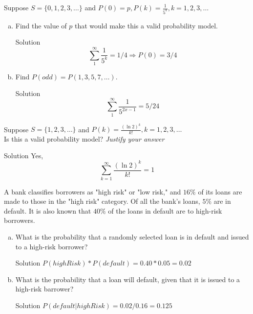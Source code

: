 \documentclass{article}
\begin{document}
\begin{spacing}{1.1}
\begin{homeworkProblem}
	Suppose $S = \{ 0,1,2,3, \dots \}$ and $P( 0) = p, P( k) = \frac{1}{{{5^k}}},k = 1,2,3, \ldots $
	\begin{enumerate}[(a)]
		\item Find the value of $p$ that would make this a valid probability model.
			\begin{homeworkSection}{Solution}
				\[\sum\limits_1^\infty  {\frac{1}{{{5^k}}}}  = 1/4 \Rightarrow P(0) = 3/4\]
			\end{homeworkSection}	
		\item Find $P( odd) = P( 1,3,5,7, \dots)$.
			\begin{homeworkSection}{Solution}
				\[\sum\limits_1^\infty  {\frac{1}{{{5^{2x - 1}}}}}  = 5/24\]
			\end{homeworkSection}	
	\end{enumerate}			
\end{homeworkProblem}
\begin{homeworkProblem}
	Suppose $S = \{ 1,2,3,\dots \}$ and $P( k) = \frac{ (\ln 2)^k}{k!}, k = 1,2,3,\dots$\\
	Is this a valid probability model? \emph{ Justify your answer}
		\begin{homeworkSection}{Solution}
			Yes, \[\sum\limits_{k = 1}^\infty  {\frac{{{{\left( {\ln 2} \right)}^k}}}{{k!}}}  = 1\]
		\end{homeworkSection}	
\end{homeworkProblem}
\begin{homeworkProblem}
A bank classifies borrowers as "high risk" or "low risk," and $16 \%$ of its loans are made to those in the "high risk" category.  Of all the bank's loans, $5\%$ are in default.  It is also known that $40\%$ of the loans in default are to high-risk borrowers.
	\begin{enumerate}[(a)]
		\item What is the probability that a randomly selected loan is in default and issued to a high-risk borrower?
			\begin{homeworkSection}{Solution}
				$P(highRisk) * P(default) = 0.40 * 0.05 = 0.02$
			\end{homeworkSection}	
		\item What is the probability that a loan will default, given that it is issued to a high-risk barrower?
			\begin{homeworkSection}{Solution}
				$P(default | highRisk) = 0.02/0.16 = 0.125$

\end{homeworkSection}
\end{enumerate}
\end{homeworkProblem}
\end{spacing}
\end{document}
